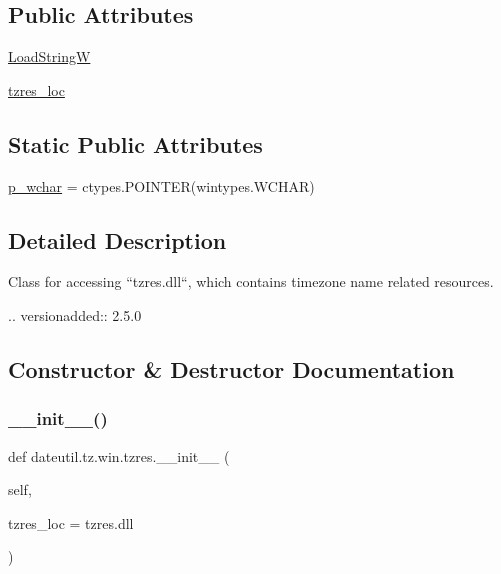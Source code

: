 \subsection*{Public Attributes}
\begin{DoxyCompactItemize}
\item 
\hyperlink{classdateutil_1_1tz_1_1win_1_1tzres_ab4ac9505f4939c48ac6a826646773bef}{Load\+StringW}
\item 
\hyperlink{classdateutil_1_1tz_1_1win_1_1tzres_ac5f17128079cebb8d7851be15c667e0a}{tzres\+\_\+loc}
\end{DoxyCompactItemize}
\subsection*{Static Public Attributes}
\begin{DoxyCompactItemize}
\item 
\hyperlink{classdateutil_1_1tz_1_1win_1_1tzres_aeeaa8963623c39ec9e593ce3eaf9eeee}{p\+\_\+wchar} = ctypes.\+P\+O\+I\+N\+T\+ER(wintypes.\+W\+C\+H\+AR)
\end{DoxyCompactItemize}


\subsection{Detailed Description}
\begin{DoxyVerb}Class for accessing ``tzres.dll``, which contains timezone name related
resources.

.. versionadded:: 2.5.0
\end{DoxyVerb}
 

\subsection{Constructor \& Destructor Documentation}
\mbox{\label{classdateutil_1_1tz_1_1win_1_1tzres_afde0ff2c11aa19b84bfd471a799dff33}} 
\subsubsection{\texorpdfstring{\+\_\+\+\_\+init\+\_\+\+\_\+()}{\_\_init\_\_()}}
{\footnotesize\ttfamily def dateutil.\+tz.\+win.\+tzres.\+\_\+\+\_\+init\+\_\+\+\_\+ (\begin{DoxyParamCaption}\item[{}]{self,  }\item[{}]{tzres\+\_\+loc = {\ttfamily \textquotesingle{}tzres.dll\textquotesingle{}} }\end{DoxyParamCaption})}



